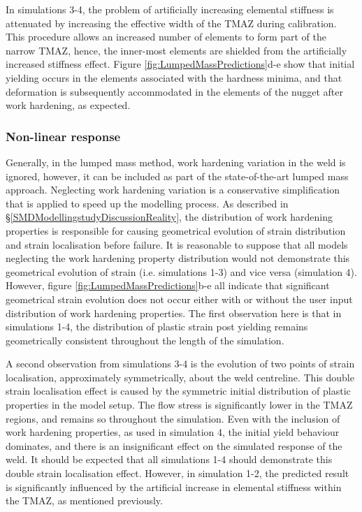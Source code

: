In simulations 3-4, the problem of artificially increasing elemental stiffness is attenuated by increasing the effective width of the TMAZ during calibration. This procedure allows an increased number of elements to form part of the narrow TMAZ, hence, the inner-most elements are shielded from the artificially increased stiffness effect. Figure \ref{fig:LumpedMassPredictions}d-e show that initial yielding occurs in the elements associated with the hardness minima, and that deformation is subsequently accommodated in the elements of the nugget after work hardening, as expected. 

\subsubsection{Non-linear response} 
\label{SMDModellingstudyResultsSims1to4Correction1Plasticity}
Generally, in the lumped mass method, work hardening variation in the weld is ignored, however, it can be included as part of the state-of-the-art lumped mass approach. Neglecting work hardening variation is a conservative simplification that is applied to speed up the modelling process. As described in \S\ref{SMDModellingstudyDiscussionReality}, the distribution of work hardening properties is responsible for causing geometrical evolution of strain distribution and strain localisation before failure. It is reasonable to suppose that all models neglecting the work hardening property distribution would not demonstrate this geometrical evolution of strain (i.e. simulations 1-3) and vice versa (simulation 4). However, figure \ref{fig:LumpedMassPredictions}b-e all indicate that significant geometrical strain evolution does not occur either with or without the user input distribution of work hardening properties. The first observation here is that in simulations 1-4, the distribution of plastic strain post yielding remains geometrically consistent throughout the length of the simulation. 

A second observation from simulations 3-4 is the evolution of two points of strain localisation, approximately symmetrically, about the weld centreline. This double strain localisation effect is caused by the symmetric initial distribution of plastic properties in the model setup. The flow stress is significantly lower in the TMAZ regions, and remains so throughout the simulation. Even with the inclusion of work hardening properties, as used in simulation 4, the initial yield behaviour dominates, and there is an insignificant effect on the simulated response of the weld. It should be expected that all simulations 1-4 should demonstrate this double strain localisation effect. However, in simulation 1-2, the predicted result is significantly influenced by the artificial increase in elemental stiffness within the TMAZ, as mentioned previously.

